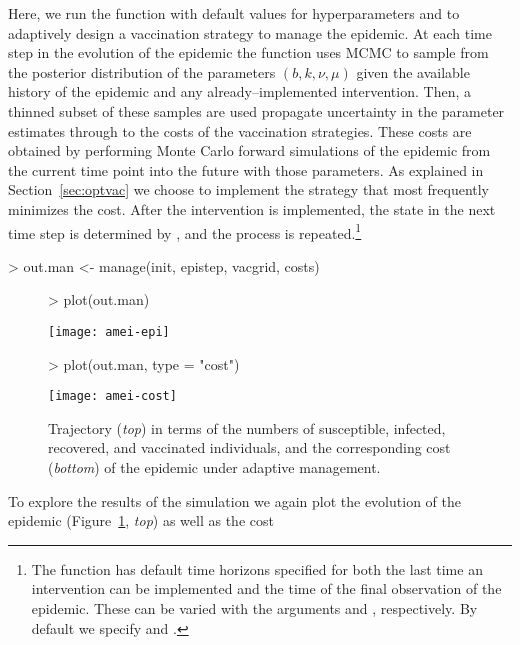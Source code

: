 \documentclass[shortnames,nojss]{jss}
\begin{document}
Here, we run the  function with default values for
hyperparameters and  to adaptively design a vaccination
strategy to manage the epidemic.  At each time step in the evolution
of the epidemic the  function uses MCMC to sample from
the posterior distribution of the parameters $(b,k,\nu,\mu)$ given the
available history of the epidemic and any already--implemented
intervention.  Then, a thinned subset of these samples are used
propagate uncertainty in the parameter estimates through to the costs
of the vaccination strategies.  These costs are obtained by performing
Monte Carlo forward simulations of the epidemic from the current time
point into the future with those parameters.  As explained in
Section~\ref{sec:optvac} we choose to implement the strategy that
most frequently minimizes the cost. After the intervention is
implemented, the state in the next time step is determined by
, and the process is repeated.\footnote{The function
   has default time horizons specified for both the last
  time an intervention can be implemented and the time of the final
  observation of the epidemic. These can be varied with the arguments
   and , respectively. By default we specify
   and .}
\begin{Schunk}
\begin{Sinput}
> out.man <- manage(init, epistep, vacgrid, costs)
\end{Sinput}
\end{Schunk}
\begin{figure}[ht!]
\begin{Schunk}
\begin{Sinput}
> plot(out.man)
\end{Sinput}
\end{Schunk}
\centering
\texttt{[image: amei-epi]}
\begin{Schunk}
\begin{Sinput}
> plot(out.man, type = "cost")
\end{Sinput}
\end{Schunk}
\centering
\texttt{[image: amei-cost]}
\caption{Trajectory ({\em top}) in terms of the numbers of susceptible,
  infected, recovered, and vaccinated individuals, and the
  corresponding cost ({\em bottom}) of the epidemic under adaptive
  management.}
\label{f:epi}
\end{figure}
To explore the results of the simulation we again plot the evolution
of the epidemic (Figure~\ref{f:epi}, {\em top}) as well as the cost
\end{document}
